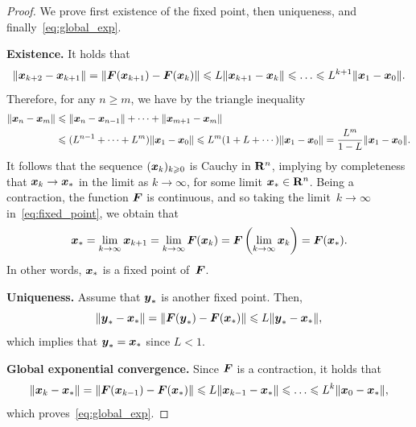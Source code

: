 \begin{proof}
    We prove first existence of the fixed point,
    then uniqueness, and finally~\eqref{eq:global_exp}.

    \noindent\textbf{Existence.}
    It holds that
    \[
        \norm[big]{\vect x_{k+2} - \vect x_{k+1}}
        = \norm[big]{\vect F(\vect x_{k+1}) - \vect F(\vect x_k)}
        \leq L\norm{\vect x_{k+1} - \vect x_k}
        \leq \dots \leq L^{k+1} \norm{\vect x_{1} - \vect x_0}.
    \]
    Therefore, for any $n \geq m$,
    we have by the triangle inequality
    \begin{align*}
        \lVert\mathbf{\boldsymbol{x}}_{n} - \mathbf{\boldsymbol{x}}_{m}\rVert
        &\leqslant \lVert\mathbf{\boldsymbol{x}}_{n} - \mathbf{\boldsymbol{x}}_{n-1}\rVert + \dotsb + \lVert\mathbf{\boldsymbol{x}}_{m+1} - \mathbf{\boldsymbol{x}}_{m}\rVert \\
        &\leqslant (L^{n-1} + \dotsb + L^{m}) \lVert\mathbf{\boldsymbol{x}}_{1} - \mathbf{\boldsymbol{x}}_0\rVert
        \leqslant L^{m} (1 + L + \dotsb) \lVert\mathbf{\boldsymbol{x}}_{1} - \mathbf{\boldsymbol{x}}_0\rVert
        = \frac{L^{m}}{1-L} \lVert\mathbf{\boldsymbol{x}}_{1} - \mathbf{\boldsymbol{x}}_0\rVert.
    \end{align*}
    It follows that the sequence $(\mathbf{\boldsymbol{x}}_k)_{k\geqslant0}$ is Cauchy in $\mathbf R^n$,
    implying by completeness that $\mathbf{\boldsymbol{x}}_k \to \mathbf{\boldsymbol{x}}_*$ in the limit as $k \to \infty$,
    for some limit $\mathbf{\boldsymbol{x}}_* \in \mathbf R^n$.
    Being a contraction, the function $\mathbf{\boldsymbol{F}}$ is continuous,
    and so taking the limit~$k \to \infty$ in~\eqref{eq:fixed_point}, we obtain that
    \[
        \mathbf{\boldsymbol{x}}_* = \lim_{k \to \infty} \mathbf{\boldsymbol{x}}_{k+1}
        = \lim_{k \to \infty} \mathbf{\boldsymbol{F}}(\mathbf{\boldsymbol{x}}_k)
        = \mathbf{\boldsymbol{F}} \left( \lim_{k \to \infty} \mathbf{\boldsymbol{x}}_k \right)
        = \mathbf{\boldsymbol{F}}(\mathbf{\boldsymbol{x}}_*).
    \]
    In other words, $\mathbf{\boldsymbol{x}}_*$ is a fixed point of~$\mathbf{\boldsymbol{F}}$.

    \vspace{.2cm}
    \noindent\textbf{Uniqueness.}
    Assume that $\mathbf{\boldsymbol{y}}_*$ is another fixed point.
    Then,
    \begin{equation*}
        \norm[big]{\vect y_* - \vect x_{*}}
        = \norm[big]{\vect F(\vect y_*) - \vect F(\vect x_{*})}
        \leq L \norm{\vect y_* - \vect x_*},
    \end{equation*}
    which implies that $\mathbf{\boldsymbol{y}}_* = \mathbf{\boldsymbol{x}}_*$ since $L < 1$.

    \vspace{.2cm}
    \noindent\textbf{Global exponential convergence.}
    Since $\mathbf{\boldsymbol{F}}$ is a contraction,
    it holds that
    \begin{equation}
        \label{eq:contraction}
        \norm[big]{\vect x_{k} - \vect x_{*}}
        = \norm[big]{\vect F(\vect x_{k-1}) - \vect F(\vect x_*)}
        \leq L\norm{\vect x_{k-1} - \vect x_*}
        \leq \dots \leq L^{k} \norm{\vect x_{0} - \vect x_*},
    \end{equation}
    which proves~\eqref{eq:global_exp}.
\end{proof}

